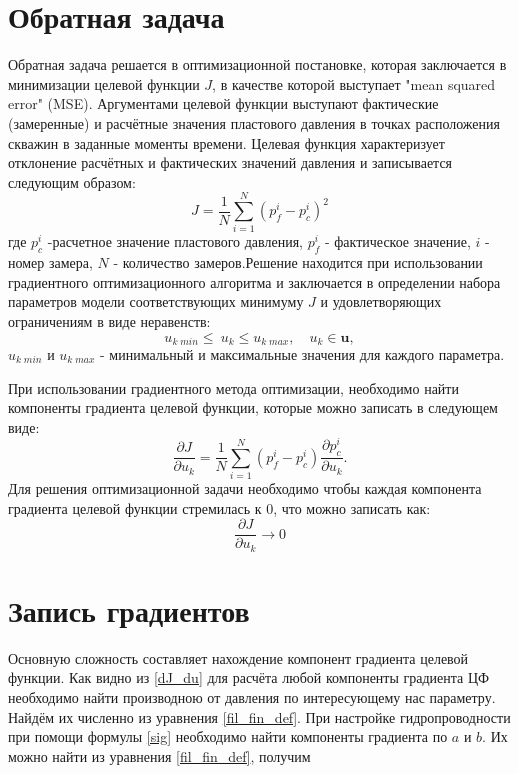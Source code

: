 \documentclass[14pt]{article}
\begin{document}
\section{Обратная задача}
Обратная задача решается в оптимизационной постановке, которая заключается в минимизации целевой функции $J$, в качестве которой выступает "mean squared error" (MSE). Аргументами целевой функции выступают фактические (замеренные) и расчётные значения пластового давления в точках расположения скважин в заданные моменты времени. Целевая функция характеризует отклонение расчётных и фактических значений давления и записывается следующим образом:
\begin{equation} \label{mape}
J=\frac{1}{N}\sum_{i=1}^N{\left(p_f^i-p_c^i\right)^2}
\end{equation}
где $p_c^i$ -расчетное значение пластового давления, $p_f^i$ - фактическое значение, $i$ - номер замера, $N$ - количество замеров.Решение находится при использовании градиентного оптимизационного алгоритма и заключается в определении набора параметров модели соответствующих минимуму $J$ и удовлетворяющих ограничениям в виде неравенств:
\begin{equation*}
u_{k\;min}\leq\ u_k\leq u_{k\;max}, \quad u_k \in \boldsymbol{u},
\end{equation*}
$u_{k\;min}$ и $u_{k\;max}$ - минимальный и максимальные значения для каждого параметра.

При использовании градиентного метода оптимизации, необходимо найти компоненты градиента целевой функции, которые можно записать в следующем виде:
\begin{equation}\label{dJ_du}
	\frac{\partial J}{\partial u_k} = \frac{1}{N}\sum_{i=1}^N \left(p_f^i-p_c^i\right)\frac{\partial p_c^i}{\partial u_k}.
\end{equation}
Для решения оптимизационной задачи необходимо чтобы каждая компонента градиента целевой функции стремилась к 0, что можно записать как:
\begin{equation} \label{dJ_du0}
\frac{\partial J}{\partial u_k} \rightarrow 0
\end{equation}

\section{Запись градиентов}
Основную сложность составляет нахождение компонент градиента целевой функции. Как видно из \ref{dJ_du} для расчёта любой компоненты градиента ЦФ необходимо найти производною от давления по интересующему нас параметру. Найдём их численно из уравнения \ref{fil_fin_def}. При настройке гидропроводности при помощи формулы  \ref{sig} необходимо найти компоненты градиента по $ a $ и $ b $. Их можно найти из уравнения \ref{fil_fin_def}, получим
\end{document}
